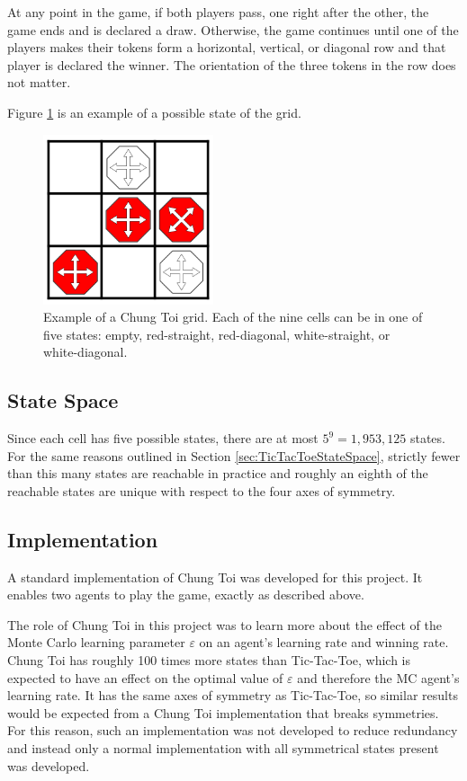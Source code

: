 \documentclass[11pt,a4paper]{report}
\begin{document}
At any point in the game, if both players pass, one right after the other, the game ends and is declared a draw. Otherwise, the game continues until one of the players makes their tokens form a horizontal, vertical, or diagonal row and that player is declared the winner. The orientation of the three tokens in the row does not matter.

Figure \ref{chung-toi-grid-example} is an example of a possible state of the grid.

\begin{figure}[htbp]
	\begin{center}
		\includegraphics[width=50mm]{chung_toi_grid_example.png}
		\caption{Example of a Chung Toi grid. Each of the nine cells can be in one of five states: empty, red-straight, red-diagonal, white-straight, or white-diagonal.}
		\label{chung-toi-grid-example}
	\end{center}
\end{figure}


\subsection{State Space}

Since each cell has five possible states, there are at most $5^9 = 1,953,125$ states. For the same reasons outlined in Section \ref{sec:TicTacToeStateSpace}, strictly fewer than this many states are reachable in practice and roughly an eighth of the reachable states are unique with respect to the four axes of symmetry.


\subsection{Implementation}

A standard implementation of Chung Toi was developed for this project. It enables two agents to play the game, exactly as described above.

The role of Chung Toi in this project was to learn more about the effect of the Monte Carlo learning parameter $\varepsilon$ on an agent's learning rate and winning rate. Chung Toi has roughly 100 times more states than Tic-Tac-Toe, which is expected to have an effect on the optimal value of $\varepsilon$ and therefore the MC agent's learning rate. It has the same axes of symmetry as Tic-Tac-Toe, so similar results would be expected from a Chung Toi implementation that breaks symmetries. For this reason, such an implementation was not developed to reduce redundancy and instead only a normal implementation with all symmetrical states present was developed.
\end{document}
